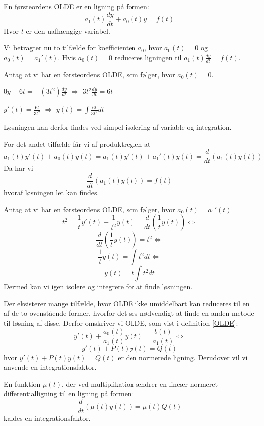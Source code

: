 En førsteordens OLDE er en ligning på formen: \\ 
$$a_{1}(t) \frac{dy}{dt} + a_{0}(t)y = f(t)$$ Hvor $t$ er den uafhængige variabel. \hfill \break

Vi betragter nu to tilfælde for koefficienten $a_0$, hvor $a_0(t) = 0$ og $a_0(t) = a_1'(t)$. Hvis $a_0(t) = 0$ reduceres ligningen til $a_1(t)\frac{dy}{dt} = f(t)$.  
\begin{Example}\hfill \break
\textnormal{Antag at vi har en førsteordens OLDE, som følger, hvor $a_0(t) = 0$.}\\
\hfill \break
\centerline{$0y - 6t = -(3t^2) \frac{dy}{dt}$ $\Rightarrow$ $3t^2 \frac{dy}{dt} = 6t$}
\hfill \break
\centerline{$y'(t) = \frac{6t}{3t^2}$ $\Rightarrow$ $y(t) = \int \frac{6t}{3t^2}dt$}
\hfill \break
\textnormal{Løsningen kan derfor findes ved simpel isolering af variable og integration.}
\end{Example}

For det andet tilfælde får vi af produktreglen at $$a_1(t)y'(t) + a_0(t)y(t) = a_1(t)y'(t) + a_1'(t)y(t) = \frac{d}{dt}(a_1(t)y(t))$$Da har vi $$\frac{d}{dt}(a_1(t)y(t)) = f(t)$$ hvoraf løsningen let kan findes.

\begin{Example} \hfill \break
\textnormal{Antag at vi har en førsteordens OLDE, som følger, hvor $a_0(t) = a_1'(t)$} \\
\hfill \break
$$t^2 = \frac{1}{t}y'(t) -\frac{1}{t^2}y(t) = \frac{d}{dt}(\frac{1}{t}y(t))\Leftrightarrow$$
$$\frac{d}{dt}(\frac{1}{t}y(t)) = t^2\Leftrightarrow$$
$$\frac{1}{t}y(t) = \int t^2dt \Leftrightarrow$$ $$ y(t) = t \int t^2dt$$
\hfill \break
\textnormal{Dermed kan vi igen isolere og integrere for at finde løsningen.}
\end{Example}

Der eksisterer mange tilfælde, hvor OLDE ikke umiddelbart kan reduceres til en af de to ovenstående former, hvorfor det ses nødvendigt at finde en anden metode til løsning af disse. Derfor omskriver vi OLDE, som vist i definition \ref{OLDE}: $${y'(t) + \frac{a_0(t)}{a_1(t)}y(t) = \frac{b(t)}{a_1(t)}} \Leftrightarrow$$
$$y'(t) + P(t)y(t) = Q(t)$$ hvor $y'(t) + P(t)y(t) = Q(t)$ er den normerede ligning. Derudover vil vi anvende en integrationsfaktor.

\begin{definition}[Integrationsfaktor]\label{IntFak}
En funktion $\mu (t)$, der ved multiplikation ændrer en lineær normeret differentialligning til en ligning på formen: $$\frac{d}{dt}(\mu (t)y(t)) = \mu (t)Q(t)$$ kaldes en integrationsfaktor.  
\end{definition}


